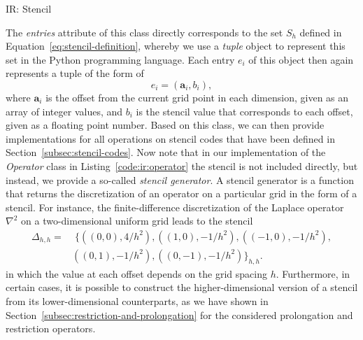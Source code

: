 \begin{listing}
	\inputminted{python}{evostencils/ir/stencil.py}
	\caption{IR: Stencil}
	\label{code:ir:stencil}
\end{listing}
The \emph{entries} attribute of this class directly corresponds to the set $S_h$ defined in Equation~\ref{eq:stencil-definition}, whereby we use a \emph{tuple} object to represent this set in the Python programming language.
Each entry $e_i$ of this object then again represents a tuple of the form of
\begin{equation}
	e_i = \left(\bm{a}_i, b_i \right),
\end{equation} 
where $\bm{a}_i$ is the offset from the current grid point in each dimension, given as an array of integer values, and $b_i$ is the stencil value that corresponds to each offset, given as a floating point number.
Based on this class, we can then provide implementations for all operations on stencil codes that have been defined in Section~\ref{subsec:stencil-codes}.
Now note that in our implementation of the \emph{Operator} class in Listing~\ref{code:ir:operator} the stencil is not included directly, but instead, we provide a so-called \emph{stencil generator}.
A stencil generator is a function that returns the discretization of an operator on a particular grid in the form of a stencil.
For instance, the finite-difference discretization of the Laplace operator $\nabla^2$ on a two-dimensional uniform grid leads to the stencil 
\begin{equation*}
	\begin{split}
		\Delta_{h,h} = & \; \big\{ \left( \left( 0,0 \right), 4 / h^2 \right), \left(\left(1,0\right), -1/h^2\right), \left(\left(-1,0\right), -1 / h^2\right), \\ & \left(\left(0,1\right), -1/h^2\right), \left(\left(0,-1\right), -1/h^2\right) \big\}_{h,h}.
	\end{split}
\end{equation*}
in which the value at each offset depends on the grid spacing $h$.
Furthermore, in certain cases, it is possible to construct the higher-dimensional version of a stencil from its lower-dimensional counterparts, as we have shown in Section~\ref{subsec:restriction-and-prolongation} for the considered prolongation and restriction operators.
